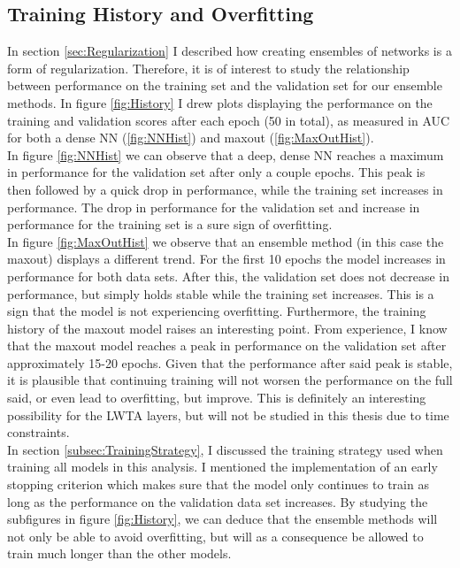 \subsection{Training History and Overfitting}\label{subsec:Overfitting}
In section \ref{sec:Regularization} I described how creating ensembles of networks is a form of regularization. Therefore,
it is of interest to study the relationship between performance on the training set and the validation set for our ensemble 
methods. In figure \ref{fig:History} I drew plots displaying the performance on the training and validation scores after each 
epoch (50 in total), as measured in \ac{AUC} for both a dense \ac{NN} (\ref{fig:NNHist}) and maxout (\ref{fig:MaxOutHist}).
\\ 
In figure \ref{fig:NNHist} we can observe that a deep, dense \ac{NN} reaches a maximum in performance for the validation set after only 
a couple epochs. This peak is then followed by a quick drop in performance, while the training set increases in performance. 
The drop in performance for the validation set and increase in performance for the training set is a sure sign of overfitting. 
\\
In figure \ref{fig:MaxOutHist} we observe that an ensemble method (in this case the maxout) displays a different trend. For the first 
10 epochs the model increases in performance for both data sets. After this, the validation set does not decrease in performance, but 
simply holds stable while the training set increases. This is a sign that the model is not experiencing overfitting. Furthermore, the 
training history of the maxout model raises an interesting point. From experience, I know that the maxout model reaches a peak in performance
on the validation set after approximately 15-20 epochs. Given that the performance after said peak is stable, it is plausible that continuing 
training will not worsen the performance on the full said, or even lead to overfitting, but improve. This is definitely an interesting possibility
for the \ac{LWTA} layers, but will not be studied in this thesis due to time constraints.
\\
In section \ref{subsec:TrainingStrategy}, I discussed the training strategy used when training all models in this analysis. I mentioned 
the implementation of an early stopping criterion which makes sure that the model only continues to train as long as the performance on the 
validation data set increases. By studying the subfigures in figure \ref{fig:History}, we can deduce that the ensemble methods will not only 
be able to avoid overfitting, but will as a consequence be allowed to train much longer than the other models.
